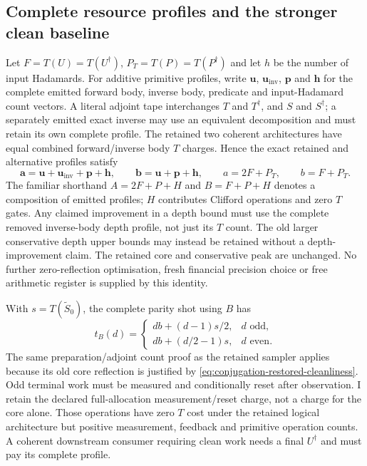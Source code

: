\subsection{Complete resource profiles and the stronger clean baseline}

Let $F=T(U)=T(U^\dagger)$, $P_T=T(P)=T(P^\dagger)$ and let
$h$ be the number of input Hadamards. For additive primitive profiles,
write $\boldsymbol u$, $\boldsymbol u_{\mathrm{inv}}$,
$\boldsymbol p$ and $\boldsymbol h$ for the complete emitted forward
body, inverse body, predicate and input-Hadamard count vectors.
A literal adjoint tape interchanges $T$ and $T^\dagger$, and $S$ and
$S^\dagger$; a separately emitted exact inverse may use an equivalent
decomposition and must retain its own complete profile. The retained
two coherent architectures have equal combined forward/inverse body
$T$ charges. Hence the exact retained and alternative profiles satisfy
\begin{equation}
 \boldsymbol a=\boldsymbol u+\boldsymbol u_{\mathrm{inv}}
                  +\boldsymbol p+\boldsymbol h,
 \qquad \boldsymbol b=\boldsymbol u+\boldsymbol p+\boldsymbol h,
 \qquad a=2F+P_T,\qquad b=F+P_T.
 \label{eq:conjugation-resource-profiles}
\end{equation}
The familiar shorthand $A=2F+P+H$ and $B=F+P+H$ denotes a
composition of emitted profiles; $H$ contributes Clifford operations
and zero $T$ gates. Any claimed improvement in a depth bound must use
the complete removed inverse-body depth profile, not just its $T$ count.
The old larger conservative depth upper bounds may instead be retained
without a depth-improvement claim. The retained
core and conservative peak are unchanged. No further zero-reflection
optimisation, fresh financial precision choice or free arithmetic
register is supplied by this identity.

With $s=T(\widetilde S_0)$, the complete parity shot using $B$ has
\begin{equation}
 t_B(d)=\begin{cases}
  db+(d-1)s/2,&d\text{ odd},\\
  db+(d/2-1)s,&d\text{ even}.
 \end{cases}
 \label{eq:conjugation-parity-resource}
\end{equation}
The same preparation/adjoint count proof as the retained sampler
applies because its old core reflection is justified by
\eqref{eq:conjugation-restored-cleanliness}. Odd terminal work must be
measured and conditionally reset after observation. I retain the
declared full-allocation measurement/reset charge, not a charge for
the core alone. Those operations have zero $T$ cost under the retained
logical architecture but positive measurement, feedback and primitive
operation counts. A coherent downstream consumer requiring clean work
needs a final $U^\dagger$ and must pay its complete profile.

